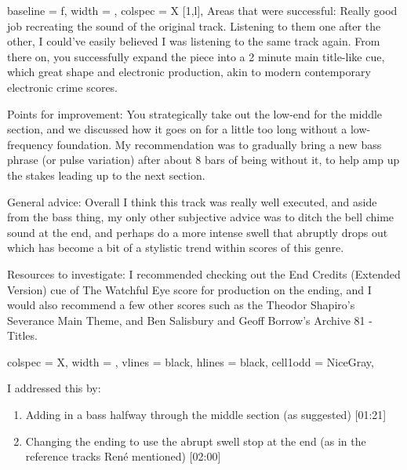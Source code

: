 \begin{longtblr}
        {
        baseline = f,
        width = \linewidth,
        colspec = {X [1,l]},
        }
        Areas that were successful: Really good job recreating the sound of the original track. Listening to them one after the other, I could've easily believed I was listening to the same track again. From there on, you successfully expand the piece into a 2 minute main title-like cue, which great shape and electronic production, akin to modern contemporary electronic crime scores.

        Points for improvement: You strategically take out the low-end for the middle section, and we discussed how it goes on for a little too long without a low-frequency foundation. My recommendation was to gradually bring a new bass phrase (or pulse variation) after about 8 bars of being without it, to help amp up the stakes leading up to the next section.

        General advice: Overall I think this track was really well executed, and aside from the bass thing, my only other subjective advice was to ditch the bell chime sound at the end, and perhaps do a more intense swell that abruptly drops out which has become a bit of a stylistic trend within scores of this genre.

        Resources to investigate: I recommended checking out the End Credits (Extended Version) cue of The Watchful Eye score for production on the ending, and I would also recommend a few other scores such as the Theodor Shapiro's Severance Main Theme, and Ben Salisbury and Geoff Borrow's Archive 81 - Titles.

\end{longtblr}

\begin{tblr}
        {
        colspec = {X},
        width = \linewidth,
         vlines = {black},
         hlines = {black},
         cell{1}{odd} = {NiceGray},
        }


    I addressed this by: \\




 \end{tblr}

 \begin{enumerate}
        \item Adding in a bass halfway through the middle section (as suggested) [01:21]
        \item Changing the ending to use the abrupt swell stop at the end (as in the reference tracks René mentioned) [02:00]

 \end{enumerate}

